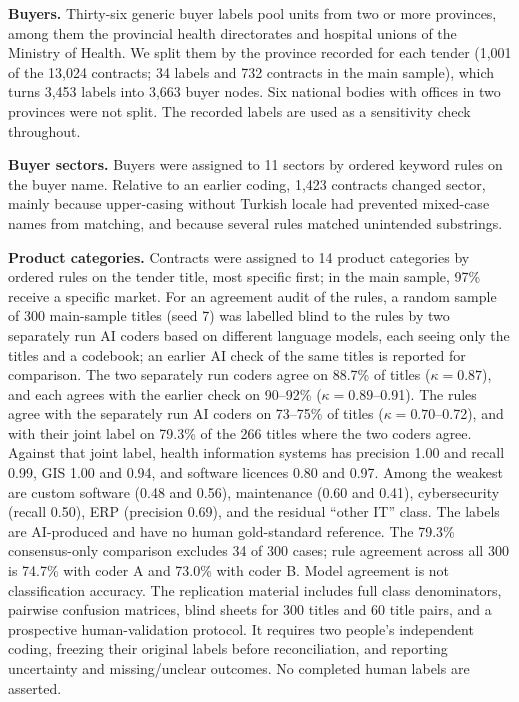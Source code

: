 \documentclass[11pt,a4paper]{article}
\begin{document}
\textbf{Buyers.} Thirty-six generic buyer labels pool units from two or more provinces, among them the provincial health directorates and hospital unions of the Ministry of Health. We split them by the province recorded for each tender (1,001 of the 13,024 contracts; 34 labels and 732 contracts in the main sample), which turns 3,453 labels into 3,663 buyer nodes. Six national bodies with offices in two provinces were not split. The recorded labels are used as a sensitivity check throughout.

\textbf{Buyer sectors.} Buyers were assigned to 11 sectors by ordered keyword rules on the buyer name. Relative to an earlier coding, 1,423 contracts changed sector, mainly because upper-casing without Turkish locale had prevented mixed-case names from matching, and because several rules matched unintended substrings.

\textbf{Product categories.} Contracts were assigned to 14 product categories by ordered rules on the tender title, most specific first; in the main sample, 97\% receive a specific market. For an agreement audit of the rules, a random sample of 300 main-sample titles (seed 7) was labelled blind to the rules by two separately run AI coders based on different language models, each seeing only the titles and a codebook; an earlier AI check of the same titles is reported for comparison. The two separately run coders agree on 88.7\% of titles ($\kappa=0.87$), and each agrees with the earlier check on 90--92\% ($\kappa=0.89$--0.91). The rules agree with the separately run AI coders on 73--75\% of titles ($\kappa=0.70$--0.72), and with their joint label on 79.3\% of the 266 titles where the two coders agree. Against that joint label, health information systems has precision 1.00 and recall 0.99, GIS 1.00 and 0.94, and software licences 0.80 and 0.97. Among the weakest are custom software (0.48 and 0.56), maintenance (0.60 and 0.41), cybersecurity (recall 0.50), ERP (precision 0.69), and the residual ``other IT'' class. The labels are AI-produced and have no human gold-standard reference. The 79.3\% consensus-only comparison excludes 34 of 300 cases; rule agreement across all 300 is 74.7\% with coder A and 73.0\% with coder B. Model agreement is not classification accuracy. The replication material includes full class denominators, pairwise confusion matrices, blind sheets for 300 titles and 60 title pairs, and a prospective human-validation protocol. It requires two people's independent coding, freezing their original labels before reconciliation, and reporting uncertainty and missing/unclear outcomes. No completed human labels are asserted.
\end{document}
